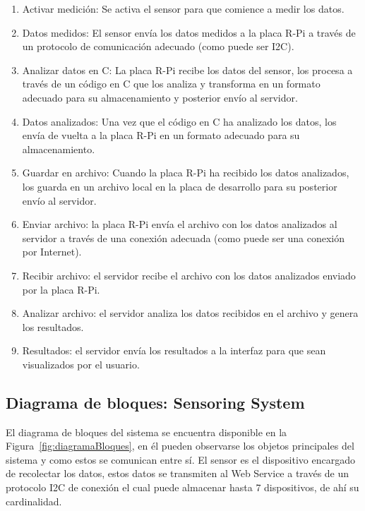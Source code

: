 \begin{enumerate}
\item Activar medición: Se activa el sensor para que comience a medir los datos.

\item Datos medidos: El sensor envía los datos medidos a la placa R-Pi a través de un protocolo de comunicación adecuado (como puede ser I2C).

\item Analizar datos en C: La placa R-Pi recibe los datos del sensor, los procesa a través de un código en C que los analiza y transforma en un formato adecuado para su almacenamiento y posterior envío al servidor.

\item Datos analizados: Una vez que el código en C ha analizado los datos, los envía de vuelta a la placa R-Pi en un formato adecuado para su almacenamiento.

\item Guardar en archivo: Cuando la placa R-Pi ha recibido los datos analizados, los guarda en un archivo local en la placa de desarrollo para su posterior envío al servidor.

\item Enviar archivo: la placa R-Pi envía el archivo con los datos analizados al servidor a través de una conexión adecuada (como puede ser una conexión por Internet).

\item Recibir archivo: el servidor recibe el archivo con los datos analizados enviado por la placa R-Pi.

\item Analizar archivo: el servidor analiza los datos recibidos en el archivo y genera los resultados.

\item Resultados: el servidor envía los resultados a la interfaz para que sean visualizados por el usuario.
\end{enumerate}


\subsection{Diagrama de bloques: Sensoring System}

El diagrama de bloques del sistema se encuentra disponible en la Figura~\ref{fig:diagramaBloques}, en él pueden observarse los objetos principales del sistema y como estos se comunican entre sí. El sensor es el dispositivo encargado de recolectar los datos, estos datos se transmiten al Web Service a través de un protocolo I2C de conexión el cual puede almacenar hasta 7 dispositivos, de ahí su cardinalidad.


